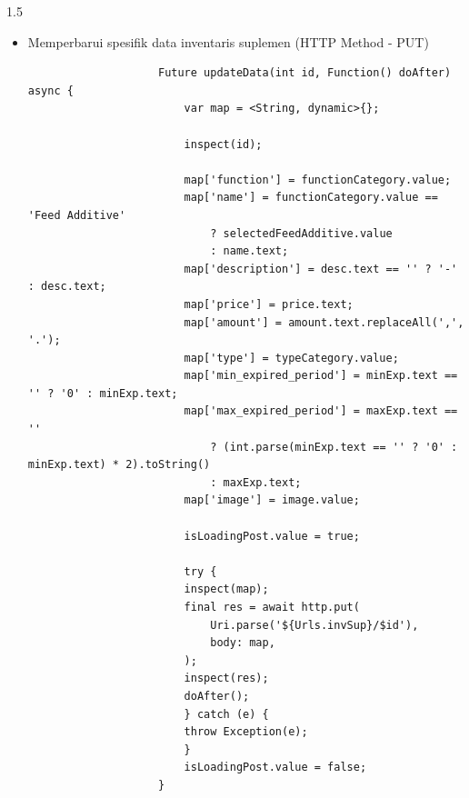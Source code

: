 \begin{spacing}{1.5}
\begin{enumerate}
\begin{enumerate}
\begin{itemize}
\begin{lstlisting}
						SharedPreferences prefs = await SharedPreferences.getInstance();
						String token = prefs.getString('token').toString();
						var headers = {'Authorization': 'Bearer $token'};

						map['function'] = functionCategory.value;
						map['name'] = functionCategory.value == 'Feed Additive'
							? selectedFeedAdditive.value
							: name.text;
						map['description'] = desc.text == '' ? '-' : desc.text;
						map['price'] = price.text;
						map['amount'] = amount.text.replaceAll(',', '.');
						map['type'] = typeCategory.value;
						map['min_expired_period'] = minExp.text == '' ? '0' : minExp.text;
						map['max_expired_period'] = maxExp.text == ''
							? (int.parse(minExp.text == '' ? '0' : minExp.text) * 2).toString()
							: maxExp.text;
						map['image'] = image.value;

						isLoadingPost.value = true;

						inspect(map);

						try {
						await http.post(
							Uri.parse(Urls.invSup),
							body: map,
							headers: headers,
						);
						doAfter();
						} catch (e) {
						throw Exception(e);
						}
						isLoadingPost.value = false;
					}

				\end{lstlisting}

				\item Memperbarui spesifik data inventaris suplemen (HTTP Method - PUT)
				
				\begin{lstlisting}
					Future updateData(int id, Function() doAfter) async {
						var map = <String, dynamic>{};

						inspect(id);

						map['function'] = functionCategory.value;
						map['name'] = functionCategory.value == 'Feed Additive'
							? selectedFeedAdditive.value
							: name.text;
						map['description'] = desc.text == '' ? '-' : desc.text;
						map['price'] = price.text;
						map['amount'] = amount.text.replaceAll(',', '.');
						map['type'] = typeCategory.value;
						map['min_expired_period'] = minExp.text == '' ? '0' : minExp.text;
						map['max_expired_period'] = maxExp.text == ''
							? (int.parse(minExp.text == '' ? '0' : minExp.text) * 2).toString()
							: maxExp.text;
						map['image'] = image.value;

						isLoadingPost.value = true;

						try {
						inspect(map);
						final res = await http.put(
							Uri.parse('${Urls.invSup}/$id'),
							body: map,
						);
						inspect(res);
						doAfter();
						} catch (e) {
						throw Exception(e);
						}
						isLoadingPost.value = false;
					}
				\end{lstlisting}


\end{itemize}
\end{enumerate}
\end{enumerate}
\end{spacing}
